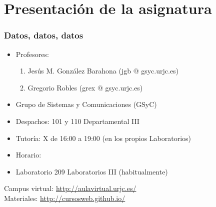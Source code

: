 
\section{Presentación de la asignatura}


\begin{frame}
\frametitle{Datos, datos, datos}

\begin{itemize}
\item Profesores:
  \begin{enumerate}
  \item Jesús M. González Barahona (jgb @ gsyc.urjc.es)
  \item Gregorio Robles (grex @ gsyc.urjc.es)
  \end{enumerate}
\item Grupo de Sistemas y Comunicaciones (GSyC)
\item Despachos: 101 y 110 Departamental III
\item Tutoría: X de 16:00 a 19:00 (en los propios Laboratorios)
\item Horario: \horario
\item Laboratorio 209 Laboratorios III (habitualmente)
\end{itemize}

\begin{flushright}
Campus virtual: {\small \url{http://aulavirtual.urjc.es/}} \\
Materiales: {\small \url{http://cursosweb.github.io/}} \\
\end{flushright}

\end{frame}


% 

